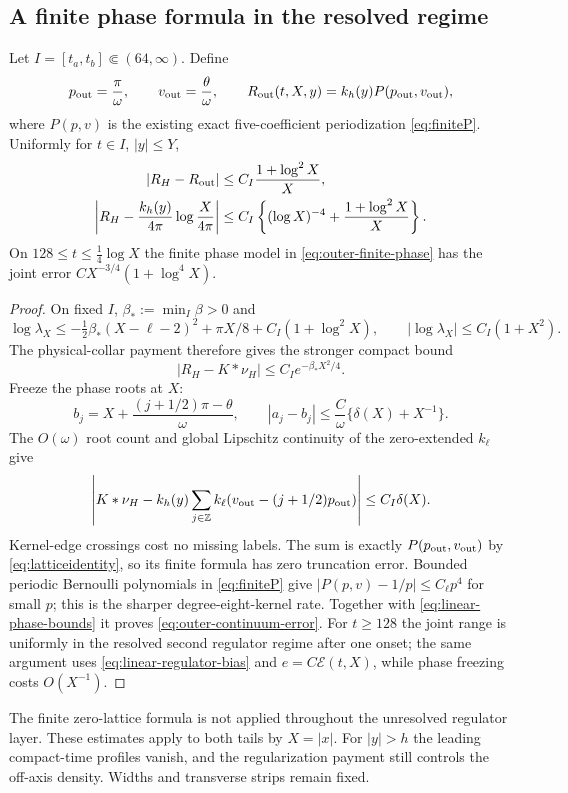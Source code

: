 \subsection{A finite phase formula in the resolved regime}
\begin{corollary}\label{cor:outer-finite-phase}
Let $I=[t_a,t_b]\Subset(64,\infty)$.  Define
\begin{equation}
 p_{\rm out}=\frac\pi\omega,\qquad
 v_{\rm out}=\frac\theta\omega,\qquad
 R_{\rm out}(t,X,y)=k_h(y)P(p_{\rm out},v_{\rm out}),
 \label{eq:outer-finite-phase}
\end{equation}
where $P(p,v)$ is the existing exact five-coefficient periodization
\eqref{eq:finiteP}.  Uniformly for $t\in I$, $|y|\le Y$,
\begin{align}
 |R_H-R_{\rm out}|&\le C_I\frac{1+\log^2X}{X},
 \label{eq:outer-finite-phase-error}\\
 \left|R_H-\frac{k_h(y)}{4\pi}\log\frac X{4\pi}\right|
 &\le C_I\left\{(\log X)^{-4}+\frac{1+\log^2X}{X}\right\}.
 \label{eq:outer-continuum-error}
\end{align}
On $128\le t\le\tfrac14\log X$ the finite phase model in
\eqref{eq:outer-finite-phase} has the joint error
$CX^{-3/4}(1+\log^4X)$.
\end{corollary}
\begin{proof}
On fixed $I$, $\beta_*:=\min_I\beta>0$ and
\begin{equation}
 \log\lambda_X\le-\tfrac12\beta_*(X-\ell-2)^2
       +\pi X/8+C_I(1+\log^2X),\qquad
 |\log\lambda_X|\le C_I(1+X^2).
 \label{eq:linear-compact-regulator}
\end{equation}
The physical-collar payment therefore gives the stronger compact bound
\begin{equation}
 |R_H-K*\nu_H|\le C_Ie^{-\beta_*X^2/4}.
 \label{eq:linear-compact-bias}
\end{equation}
Freeze the phase roots at $X$:
\[
 b_j=X+\frac{(j+1/2)\pi-\theta}{\omega},\qquad
 |a_j-b_j|\le\frac C\omega\{\delta(X)+X^{-1}\}.
\]
The $O(\omega)$ root count and global Lipschitz continuity of the
zero-extended $k_\ell$ give
\[
 \left|K*\nu_H-k_h(y)
  \sum_{j\in\mathbb Z}k_\ell(v_{\rm out}-(j+1/2)p_{\rm out})\right|
 \le C_I\delta(X).
\]
Kernel-edge crossings cost no missing labels.  The sum is exactly
$P(p_{\rm out},v_{\rm out})$ by \eqref{eq:latticeidentity}, so its
finite formula has zero truncation error.  Bounded periodic Bernoulli
polynomials in \eqref{eq:finiteP} give
$|P(p,v)-1/p|\le C_\ell p^4$ for small $p$; this is the sharper
degree-eight-kernel rate.  Together with
\eqref{eq:linear-phase-bounds} it proves
\eqref{eq:outer-continuum-error}.  For $t\ge128$ the joint range is
uniformly in the resolved second regulator regime after one onset;
the same argument uses \eqref{eq:linear-regulator-bias} and
$e=C\mathcal E(t,X)$, while phase freezing costs $O(X^{-1})$.
\end{proof}
The finite zero-lattice formula is not applied throughout the
unresolved regulator layer.  These estimates apply to both tails by
$X=|x|$.  For $|y|>h$ the leading compact-time profiles vanish, and
the regularization payment still controls the off-axis density.
Widths and transverse strips remain fixed.

